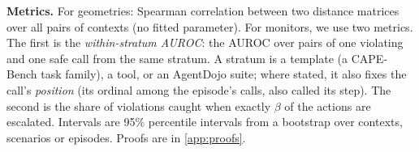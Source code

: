 \textbf{Metrics.} For geometries: Spearman correlation between two distance matrices over all pairs of contexts (no fitted parameter). For monitors, we use two metrics. The first is the \emph{within-stratum AUROC}: the AUROC over pairs of one violating and one safe call from the same stratum. A stratum is a template (a CAPE-Bench task family), a tool, or an AgentDojo suite; where stated, it also fixes the call's \emph{position} (its ordinal among the episode's calls, also called its step). The second is the share of violations caught when exactly $\beta$ of the actions are escalated. Intervals are 95\% percentile intervals from a bootstrap over contexts, scenarios or episodes. Proofs are in \cref{app:proofs}.
